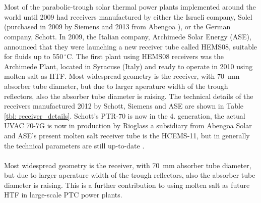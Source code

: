 \documentclass[Master,MEE,english]{twbook}%
\begin{document}
\\\\
Most of the parabolic-trough solar thermal power plants implemented around the world until 2009 had receivers manufactured by either the Israeli company, Solel (purchased in 2009 by Siemens and 2013 from Abengoa \cite{Alcauza2013}), or the German company, Schott. In 2009, the Italian company, Archimede Solar Energy (ASE), announced that they were launching a new receiver tube called HEMS08, suitable for fluids up to 550$\,^{\circ}\mathrm{C}$. The first plant using HEMS08 receivers was the Archimede Plant, located in Syracuse (Italy) and ready to operate in 2010 using molten salt as HTF. Most widespread geometry is the receiver, with 70~mm absorber tube diameter, but due to larger aperature width of the trough reflectors, also the absorber tube diameter is raising. The technical details of the receivers manufactured 2012 by Schott, Siemens and ASE are shown in Table \ref{tbl: receiver_details}. Schott's PTR-70 is now in the 4. generation, the actual UVAC 70-7G is now in production by Rioglass a subsidiary from Abengoa Solar and ASE's present molten salt receiver tube is the HCEMS-11, but in generally the technical parameters are still up-to-date \cite{Schott2015,ArchimedeSolarEnergy2015,RioglassSolarInternational2014}.
\\\\
Most widespread geometry is the receiver, with 70~mm absorber tube diameter, but due to larger aperature width of the trough reflectors, also the absorber tube diameter is raising. This is a further contribution to using molten salt as future HTF in large-scale PTC power plants. 
\pagebreak
\end{document}

